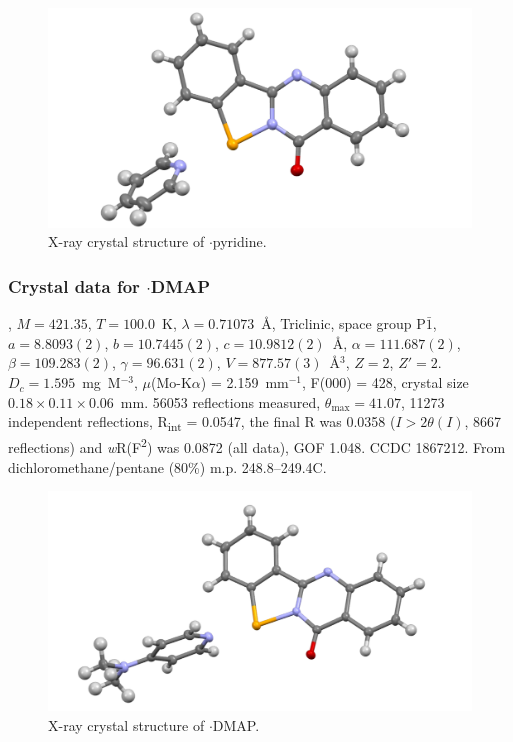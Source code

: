 \begin{refsection}
\begin{figure}
  \includegraphics[width=0.6\linewidth]{Figures/tetracycle-py-xtal.pdf}
  \caption{X-ray crystal structure of \texorpdfstring{$\cdot$pyridine}{C19H13N3OSe}.}
\end{figure}

\subsubsection{Crystal data for \texorpdfstring{$\cdot$DMAP}{C21H18N4OSe}}
, $M = 421.35$, $T=100.0$~K, $\lambda=0.71073$~\AA, Triclinic, space group P$\bar{1}$, $a = 8.8093(2)$, $b = 10.7445(2)$, $c = 10.9812(2)$~\AA, $\alpha = 111.687(2)$\degree, $\beta = 109.283(2)$\degree, $\gamma = 96.631(2)$\degree, $V = 877.57(3)$~\AA$^{3}$, $Z = 2$, $Z\prime = 2$.
$D_{c}= 1.595$~mg~M$^{-3}$, $\mu$(Mo-K$\alpha$) = 2.159~mm$^{-1}$, F(000) = 428, crystal size $0.18 \times 0.11 \times 0.06$~mm.
56053 reflections measured, $\theta_{\mathrm{max}} = 41.07$\degree, 11273 independent reflections, R\textsubscript{int} = 0.0547, the final R was 0.0358 ($I > 2\theta(I)$, 8667 reflections) and \emph{w}R(F\textsuperscript{2}) was 0.0872 (all data), GOF 1.048.
CCDC 1867212.
From dichloromethane/pentane (80\%) m.p. 248.8--249.4\degree C.

\begin{figure}
  \includegraphics[width=0.6\linewidth]{Figures/tetracycle-dmap-xtal.pdf}
  \caption{X-ray crystal structure of \texorpdfstring{$\cdot$DMAP}{C21H18N4OSe}.}
\end{figure}

\printbibliography[heading=subbibliography]
\end{refsection}


